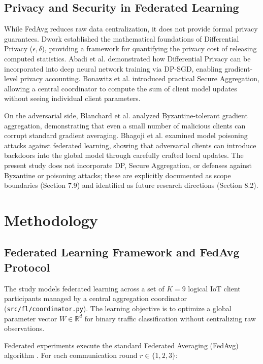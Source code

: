 \documentclass[11pt,a4paper]{article}
\begin{document}
\subsection{Privacy and Security in Federated Learning}
While FedAvg reduces raw data centralization, it does not provide formal privacy guarantees. Dwork \cite{ref11} established the mathematical foundations of Differential Privacy ($\epsilon, \delta$), providing a framework for quantifying the privacy cost of releasing computed statistics. Abadi et al. \cite{ref12} demonstrated how Differential Privacy can be incorporated into deep neural network training via DP-SGD, enabling gradient-level privacy accounting. Bonawitz et al. \cite{ref13} introduced practical Secure Aggregation, allowing a central coordinator to compute the sum of client model updates without seeing individual client parameters.

On the adversarial side, Blanchard et al. \cite{ref14} analyzed Byzantine-tolerant gradient aggregation, demonstrating that even a small number of malicious clients can corrupt standard gradient averaging. Bhagoji et al. \cite{ref15} examined model poisoning attacks against federated learning, showing that adversarial clients can introduce backdoors into the global model through carefully crafted local updates. The present study does not incorporate DP, Secure Aggregation, or defenses against Byzantine or poisoning attacks; these are explicitly documented as scope boundaries (Section 7.9) and identified as future research directions (Section 8.2).

\section{Methodology}

\subsection{Federated Learning Framework and FedAvg Protocol}
The study models federated learning across a set of $K = 9$ logical IoT client participants managed by a central aggregation coordinator (\texttt{src/fl/coordinator.py}). The learning objective is to optimize a global parameter vector $W \in \mathbb{R}^d$ for binary traffic classification without centralizing raw observations.

Federated experiments execute the standard Federated Averaging (FedAvg) algorithm \cite{ref1}. For each communication round $r \in \{1, 2, 3\}$:
\end{document}
